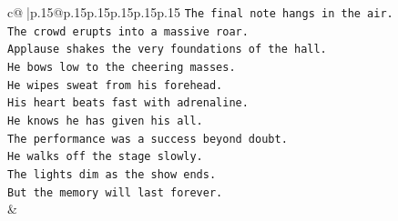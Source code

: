 \documentclass{article}
\begin{document}
{\begin{supertabular}{c@{$\;$}|p{.15\linewidth}@{}p{.15\linewidth}p{.15\linewidth}p{.15\linewidth}p{.15\linewidth}p{.15\linewidth}}
{{{\texttt{The final note hangs in the air.} \\
\texttt{The crowd erupts into a massive roar.} \\
\texttt{Applause shakes the very foundations of the hall.} \\
\texttt{He bows low to the cheering masses.} \\
\texttt{He wipes sweat from his forehead.} \\
\texttt{His heart beats fast with adrenaline.} \\
\texttt{He knows he has given his all.} \\
\texttt{The performance was a success beyond doubt.} \\
\texttt{He walks off the stage slowly.} \\
\texttt{The lights dim as the show ends.} \\
\texttt{But the memory will last forever.} \\
            }
        }
    }
    & \\ \\


\end{supertabular}}
\end{document}

